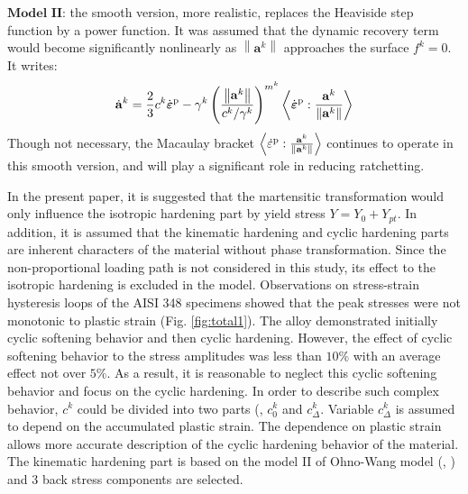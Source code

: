 \documentclass[preprint,5p,twocolumn,10pt,sort&compress]{elsarticle}
\newcommand{\bfepsilon}{{\mbox{\boldmath{$\varepsilon$}}}}
\begin{document}
$\textbf{Model II}$: the smooth version, more realistic, replaces the Heaviside step function by a power function. It was assumed that the dynamic recovery term would become significantly nonlinearly as $\left\|\mathbf{a}^{k}\right\|$ approaches the surface $f^{k}=0$. It writes:
\begin{equation}\label{eq:Ohno Wang model 2}
\dot{\mathbf{a}}^{k}=\frac{2}{3} c^{k} \dot{\bfepsilon}^{\mathrm{p}}-\gamma^{k}\left(\frac{\left\|\mathbf{a}^{k}\right\|}{c^{k} / \gamma^{k}}\right)^{m^{k}}\left \langle \dot{\bfepsilon}^{\rm p}: \frac{\mathbf{a}^{k}}{\left \| \mathbf{a}^{k} \right \|}\right \rangle
\end{equation}
Though not necessary, the Macaulay bracket $\left\langle\dot{\varepsilon}^{\rm p} : \frac{\mathbf{a}^{k}}{\left\|\mathbf{a}^{k}\right\|}\right\rangle$ continues to operate in this smooth version, and will play a significant role in reducing ratchetting.

In the present paper, it is suggested that the martensitic transformation would only influence the isotropic hardening part by yield stress $Y=Y_{0}+Y_{pt}$. In addition, it is assumed that the kinematic hardening and cyclic hardening parts are inherent characters of the material without phase transformation. Since the non-proportional loading path is not considered in this study, its effect to the isotropic hardening is excluded in the model. Observations on stress-strain hysteresis loops of the AISI 348 specimens showed that the peak stresses were not monotonic to plastic strain (Fig. \ref{fig:total1}). The alloy demonstrated initially cyclic softening behavior and then cyclic hardening. However, the effect of cyclic softening behavior to the stress amplitudes was less than $10\%$ with an average effect not over $5\%$. As a result, it is reasonable to neglect this cyclic softening behavior and focus on the cyclic hardening. In order to describe such complex behavior, $c^{k}$ could be divided into two parts (\citeauthor{Fang2015Cyclic}, $c_{0}^{k}$ and $c_{\Delta}^{k}$. Variable $c_{\Delta}^{k}$ is assumed to depend on the accumulated plastic strain. The dependence on plastic strain allows more accurate description of the cyclic hardening behavior of the material. The kinematic hardening part is based on the model II of Ohno-Wang model (\citeauthor{Ohno1993Kinematic}, \citeyear{Ohno1993Kinematic}) and 3 back stress components are selected.
\end{document}
